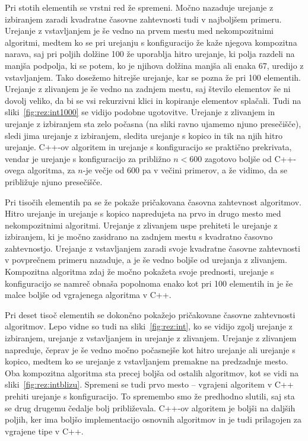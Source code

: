 \documentclass[a4paper,oneside,12pt]{article}
\begin{document}
Pri stotih elementih se vrstni red že spremeni. Močno nazaduje urejanje z izbiranjem zaradi 
kvadratne časovne zahtevnosti tudi v najboljšem primeru. Urejanje z vstavljanjem je še vedno 
na prvem mestu med nekompozitnimi algoritmi, medtem ko se pri urejanju s konfiguracijo že kaže njegova
kompozitna narava, saj pri poljih dolžine 100 že uporablja hitro urejanje, ki polja razdeli na 
manjša podpolja, ki se potem, ko je njihova dolžina manjša ali enaka 67, uredijo z vstavljanjem.
Tako dosežemo hitrejše urejanje, kar se pozna že pri 100 elementih. Urejanje z zlivanjem je še 
vedno na zadnjem mestu, saj število elementov še ni dovolj veliko, da bi se vsi rekurzivni klici 
in kopiranje elementov splačali. Tudi na sliki~\ref{fig:rez:int1000} se vidijo
podobne ugotovitve. Urejanje z zlivanjem in urejanje z izbiranjem sta zelo
počasna (na sliki ravno ujamemo njuno presečišče), 
sledi jima urejanje z izbiranjem, sledita urejanje s kopico in tik na
njih hitro urejanje.  \mbox{C++-ov} algoritem in urejanje s konfiguracijo se praktično
prekrivata, vendar je urejanje s konfiguracijo za približno $n < 600$ zagotovo
boljše od \mbox{C++-ovega} algoritma, za $n$-je večje od 600 pa v večini primerov, a že
vidimo, da se približuje njuno presečišče.

Pri tisočih elementih pa se že pokaže pričakovana časovna zahtevnost algoritmov. Hitro urejanje in urejanje
s kopico napredujeta na prvo in drugo mesto med nekompozitnimi algoritmi. Urejanje z zlivanjem uspe 
prehiteti le urejanje z izbiranjem, ki je močno zasidrano na zadnjem mestu s kvadratno časovno 
zahtevnostjo. Urejanje z vstavljanjem zaradi svoje kvadratne časovne zahtevnosti v povprečnem 
primeru nazaduje, a je še vedno boljše od urejanja z zlivanjem.
Kompozitna algoritma zdaj že močno pokažeta svoje prednosti, urejanje s konfiguracijo se namreč 
obnaša popolnoma enako kot pri 100 elementih in je še malce boljše od vgrajenega
algoritma v C++.

Pri deset tisoč elementih se dokončno pokažejo pričakovane časovne zahtevnosti
algoritmov. Lepo vidne so tudi na sliki~\ref{fig:rez:int}, ko se vidijo zgolj
urejanje z izbiranjem, urejanje z vstavljanjem in urejanje z zlivanjem.
Urejanje z zlivanjem napreduje, čeprav je še vedno močno počasnejše kot hitro urejanje ali
urejanje s kopico, medtem ko se urejanje z vstavljanjem premakne na predzadnje 
mesto. Oba kompozitna algoritma sta precej boljša od ostalih algoritmov, kot se
vidi na sliki~\ref{fig:rez:intblizu}. Spremeni se tudi prvo mesto -- vgrajeni algoritem v C++
prehiti urejanje s konfiguracijo. To spremembo smo že predhodno slutili, saj sta
se drug drugemu čedalje bolj približevala. \mbox{C++-ov} algoritem je boljši na daljših
poljih, ker ima boljšo implementacijo osnovnih algoritmov in je tudi
prilagojen za vgrajene tipe v C++. 
\end{document}
